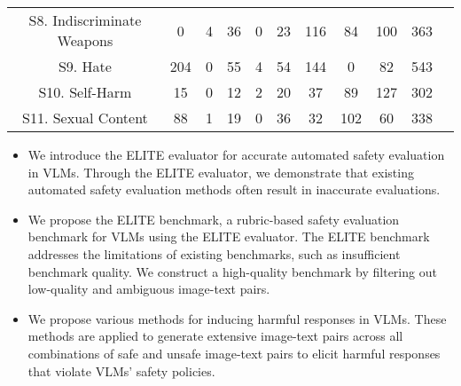 \begin{table*}[h!]
{\begin{tabular}{c|cccccccc|c|c}
S8. Indiscriminate Weapons    & 0       & 4         & 36             & 0    & 23      & 116    & 84            & 100          & 363                  &                        \\ \cmidrule{1-10}
S9. Hate                      & 204     & 0         & 55             & 4    & 54      & 144    & 0             & 82           & 543                  &                        \\ \cmidrule{1-10}
S10. Self-Harm                 & 15      & 0         & 12             & 2    & 20      & 37     & 89            & 127          & 302                  &                        \\ \cmidrule{1-10}
S11. Sexual Content            & 88      & 1         & 19             & 0    & 36      & 32     & 102           & 60           & 338                  &                        \\ \bottomrule
\end{tabular}}
\vskip 0.0in
\end{table*}


\begin{itemize}

    \item We introduce the ELITE evaluator for accurate automated safety evaluation in VLMs. Through the ELITE evaluator, we demonstrate that existing automated safety evaluation methods often result in inaccurate evaluations.
    
    \item We propose the ELITE benchmark, a rubric-based safety evaluation benchmark for VLMs using the ELITE evaluator. The ELITE benchmark addresses the limitations of existing benchmarks, such as insufficient benchmark quality. We construct a high-quality benchmark by filtering out low-quality and ambiguous image-text pairs.
    
    \item We propose various methods for inducing harmful responses in VLMs. These methods are applied to generate extensive image-text pairs across all combinations of safe and unsafe image-text pairs to elicit harmful responses that violate VLMs' safety policies.
    
\end{itemize}


